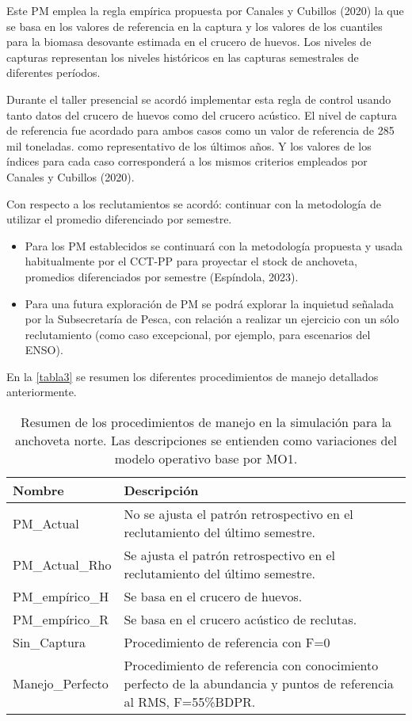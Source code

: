 Este PM emplea la regla empírica propuesta por Canales y Cubillos (2020) la que se basa en los valores de referencia en la captura y los valores de los cuantiles para la biomasa desovante estimada en el crucero de huevos. Los niveles de capturas representan los niveles históricos en las capturas semestrales de diferentes períodos.

Durante el taller presencial se acordó implementar esta regla de control usando tanto datos del crucero de huevos como del crucero acústico. El nivel de captura de referencia fue acordado para ambos casos como un valor de referencia de 285 mil toneladas. como representativo de los últimos años. Y los valores de los índices para cada caso corresponderá a los mismos criterios empleados por Canales y Cubillos (2020). 

Con respecto a los reclutamientos se acordó: continuar con la metodología de utilizar el promedio diferenciado por semestre.

\begin{itemize}
    \item Para los PM establecidos se continuará con la metodología propuesta y usada habitualmente por el CCT-PP para proyectar el stock de anchoveta, promedios diferenciados por semestre (Espíndola, 2023). 
    \item Para una futura exploración de PM se podrá explorar la inquietud señalada por la Subsecretaría de Pesca, con relación a realizar un ejercicio con un sólo reclutamiento (como caso excepcional, por ejemplo, para escenarios del ENSO).
\end{itemize}

En la \ref{tabla3} se resumen los diferentes procedimientos de manejo detallados anteriormente.

\begin{table}[h]
    \centering
    \caption{Resumen de los procedimientos de manejo en la simulación para la anchoveta norte. Las descripciones se entienden como variaciones del modelo operativo base por MO1.}
    \label{tab:tabla3}
    \begin{tabular}{|p{3.5cm}|p{10cm}|}
        \hline
        \textbf{Nombre} & \textbf{Descripción} \\
        \hline
        PM\_Actual & No se ajusta el patrón retrospectivo en el reclutamiento del último semestre.\\
        \hline
        PM\_Actual\_Rho & Se ajusta el patrón retrospectivo en el reclutamiento del último semestre.\\
        \hline
        PM\_empírico\_H & Se basa en el crucero de huevos. \\
        \hline
        PM\_empírico\_R & Se basa en el crucero acústico de reclutas. \\
        \hline
        Sin\_Captura & Procedimiento de referencia con F=0 \\
        \hline
        Manejo\_Perfecto & Procedimiento de referencia con conocimiento perfecto de la abundancia y puntos de referencia al RMS, F=55\%BDPR.\\
        \hline
    \end{tabular}
\end{table}


